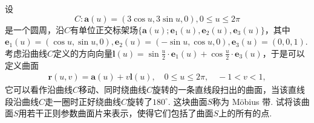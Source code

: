 \documentclass[../../main.tex]{subfiles}%
\begin{document}
\begin{example}
设
$$
C: \bm{a}(u) = (3\cos u, 3\sin u, 0), 0 \leqslant u \leqslant 2\pi
$$
是一个圆周，沿$C$有单位正交标架场$\{\bm{a}(u); \bm{e}_1(u), \bm{e}_2(u), \bm{e}_3(u)\}$，其中$\bm{e}_1(u) = (\cos u, \sin u, 0), \bm{e}_2(u) = (-\sin u, \cos u, 0), \bm{e}_3(u) = (0,0,1)$. 考虑沿曲线$C$定义的方向向量$\bm{l}(u) = \sin \frac{u}{2} \cdot \bm{e}_1(u) + \cos \frac{u}{2} \cdot \bm{e}_3(u)$，于是可以定义曲面
\begin{align*}
\bm{r}(u,v) = \bm{a}(u) + v\bm{l}(u), \quad 0 \leqslant u \leqslant 2\pi, \quad -1 < v < 1,
\end{align*}
它可以看作沿曲线$C$移动、同时绕曲线$C$旋转的一条直线段扫出的曲面，当该直线段沿曲线$C$走一圈时正好绕曲线$C$旋转了$180^\circ$. 这块曲面$S$称为 Möbius 带. 试将该曲面$S$用若干正则参数曲面片来表示，使得它们包括了曲面$S$上的所有的点.
\end{example}
\begin{solution}


\end{solution}
\end{document}
